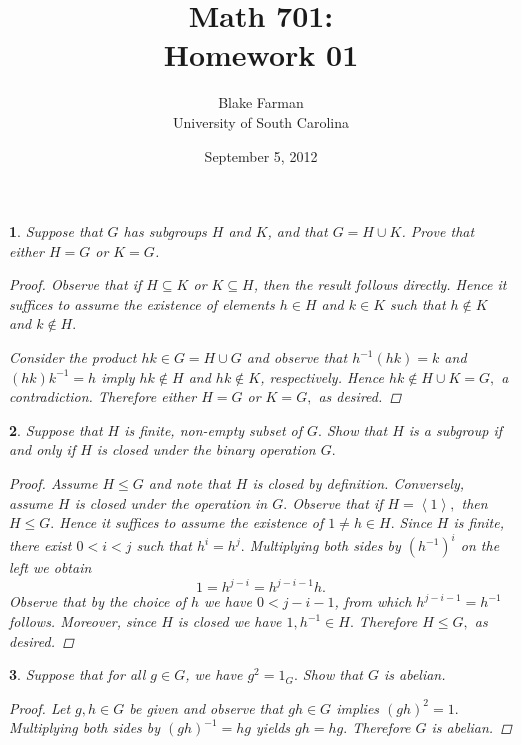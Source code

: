 \documentclass[10pt]{amsart}
\author{Blake Farman\\University of South Carolina}
\title{Math 701:\\Homework 01}
\date{September 5, 2012}
\begin{document}
\maketitle

\newtheorem{thm}{}
\begin{thm}
	Suppose that $G$ has subgroups $H$ and $K$, and that $G = H \cup K$.  Prove that either $H = G$ or $K = G$.
	\begin{proof}
		Observe that if $H \subseteq K$ or $K \subseteq H$, then the result follows directly.
		Hence it suffices to assume the existence of elements $h \in H$ and $k \in K$ such that $h \not\in K$ and $k \not\in H.$
		
		Consider the product $hk \in G = H \cup G$ and observe that $h^{-1}(hk) = k$ and $(hk)k^{-1} = h$ imply $hk \not\in H$ and $hk \not \in K$, respectively.  Hence $hk \not \in H \cup K = G,$ a contradiction.  Therefore either $H = G$ or $K = G,$ as desired.
	\end{proof}
\end{thm}

\begin{thm}
	Suppose that $H$ is finite, non-empty subset of $G.$  Show that $H$ is a subgroup if and only if $H$ is closed under the  binary operation $G.$
	\begin{proof}
	Assume $H \leq G$ and note that $H$ is closed by definition.  
	Conversely, assume $H$ is closed under the operation in $G.$
	Observe that if $H = \left< 1 \right> ,$ then $H \leq G.$
	Hence it suffices to assume the existence of $1 \not = h \in H.$  
	Since $H$ is finite, there exist $0< i < j$ such that $h^i = h^j.$  
	Multiplying both sides by $(h^{-1})^i$ on the left we obtain
		$$1 = h^{j-i} = h^{j-i-1}h.$$
	Observe that by the choice of $h$ we have $0 < j-i-1$, from which $h^{j-i-1} = h^{-1}$ follows.  
	Moreover, since $H$ is closed we have $1, h^{-1} \in H.$  
	Therefore $H \leq G,$ as desired.
	\end{proof}
\end{thm}

\begin{thm}
	Suppose that for all $g \in G$, we have $g^2 = 1_G.$  Show that $G$ is abelian.
	\begin{proof}
	Let $g,h \in G$ be given and observe that $gh \in G$ implies $(gh)^2 = 1.$  
	Multiplying both sides by $(gh)^{-1} = hg$ yields $gh = hg.$ 
	Therefore $G$ is abelian.
	\end{proof}
\end{thm}
\end{document}
